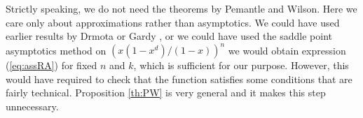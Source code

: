 \documentclass{article}
\begin{document}
Strictly speaking, we do not need the theorems by Pemantle and Wilson.
Here we care only about approximations rather than asymptotics. We could
have used earlier results by Drmota \cite{Drmota1994} or Gardy
\cite{Gardy1995}, or we could have used the saddle point asymptotics
method on $(x(1-x^d)/(1-x))^n$ we would obtain expression (\ref{eq:assRA})
for fixed $n$ and $k$, which is sufficient for our purpose. However, this
would have required to check that the function satisfies some conditions
that are fairly technical. Proposition \ref{th:PW} is very general and it
makes this step unnecessary.





\end{document}
